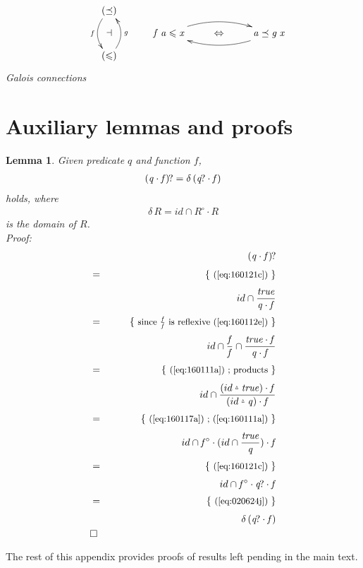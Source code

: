 \documentclass{elsarticle}
\newtheorem{lemma}[theorem]{Lemma} %
\newcommand{\Conid}[1]{\mathit{#1}}
\newcommand{\Varid}[1]{\mathit{#1}}
\renewcommand{\leq}{\leqslant}
\def\ap#1#2{#1\,#2}
\def\comp{ \mathbin{\cdot} }
\def\conv#1{#1^\circ}
\def\just#1#2{\\ &#1& \rule{2em}{0pt} \{ \mbox{\rule[-.7em]{0pt}{1.8em} \small #2 \/} \} \nonumber\\ && }
\def\qed{\\&\Box&\nonumber}
\def\kr{\mathbin{\hbox{\tiny${}^\triangledown$}}}
\def\start{&&}
\def\kr{\mathbin{\hbox{\tiny${}^\vartriangle$}}}
\def\equiv{\Leftrightarrow}
\begin{document}
\begin{eqnarray*}
\rule{1em}{0pt}
\vcenter{
\xymatrix@R=2ex{
	\ensuremath{(\preceq )}
		\ar@/_1pc/[dd]_{\ensuremath{\Varid{f}}}
\\
	\dashv
\\
	\ensuremath{(\leq )}
		\ar@/_1pc/[uu]_{\ensuremath{\Varid{g}}}
}}
& \rule{1em}{0pt} &
\vcenter{
\xymatrix{
	\ensuremath{\Varid{f}\;\Varid{a}\leq \Varid{x}}
 		\ar@/^1pc/[rr]^{\ensuremath{}}
&
	\equiv
&
	\ensuremath{\Varid{a}\preceq \Varid{g}\;\Varid{x}}
		\ar@/^1pc/[ll]^{\ensuremath{}}
}}
\end{eqnarray*}
\hfill \emph{Galois connections}
%

\section{Auxiliary lemmas and proofs}
\label{sec:150329b}

\begin{lemma}
Given predicate \ensuremath{\Varid{q}} and function \ensuremath{\Varid{f}},
\begin{eqnarray}
	\ensuremath{(\Varid{q} \comp \Varid{f})\hskip-1pt\mathit{?}} = \ensuremath{\ap{\delta}(\Varid{q}\hskip-1pt\mathit{?} \comp \Varid{f})}
	\label{eq:150924a}
\end{eqnarray}
holds, where
\begin{eqnarray}
	\ensuremath{\ap{\delta}\Conid{R}\mathrel{=}{{id}}\mathbin\cap{\conv{\Conid{R}} \comp \Conid{R}}}
	\label{eq:020624j}
\end{eqnarray}
is the \emph{domain} of \ensuremath{\Conid{R}}.
\\ Proof:
\begin{eqnarray*}
\start
	\ensuremath{(\Varid{q} \comp \Varid{f})\hskip-1pt\mathit{?}}
%
\just={ (\ref{eq:160121c}) }
%
	\ensuremath{{{id}}\mathbin\cap{\frac{\Varid{true}}{\Varid{q} \comp \Varid{f}}}}
%
\just={ since \ensuremath{\frac{\Varid{f}}{\Varid{f}}} is reflexive (\ref{eq:160112e}) }
%
	\ensuremath{{{id}}\mathbin\cap{{\frac{\Varid{f}}{\Varid{f}}}\mathbin\cap{\frac{\Varid{true} \comp \Varid{f}}{\Varid{q} \comp \Varid{f}}}}}
%
\just={ (\ref{eq:160111a}) ; products }
%
	\ensuremath{{{id}}\mathbin\cap{\frac{({{id}}\kr{\Varid{true}}) \comp \Varid{f}}{({{id}}\kr{\Varid{q}}) \comp \Varid{f}}}}
%
\just={ (\ref{eq:160117a}) ; (\ref{eq:160111a}) }
%
	\ensuremath{{{id}}\mathbin\cap{\conv{\Varid{f}} \comp ({{id}}\mathbin\cap{\frac{\Varid{true}}{\Varid{q}}}) \comp \Varid{f}}}
%
\just={ (\ref{eq:160121c}) }
%
	\ensuremath{{{id}}\mathbin\cap{\conv{\Varid{f}} \comp \Varid{q}\hskip-1pt\mathit{?} \comp \Varid{f}}}
%
\just={ (\ref{eq:020624j}) }
%
	\ensuremath{\ap{\delta}(\Varid{q}\hskip-1pt\mathit{?} \comp \Varid{f})}
\qed
\end{eqnarray*}
\end{lemma}
%
The rest of this appendix provides proofs of results left pending in the main text. %
\end{document}
